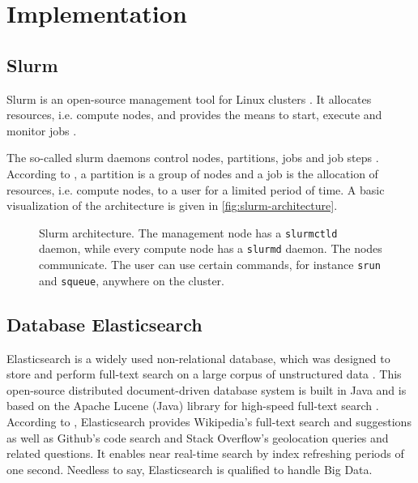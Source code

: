 \newcommand{\databaseName}{Elasticsearch}
\chapter{Implementation}\label{ch:implementation}


\section{Slurm}\label{subsec:slurm}

Slurm is an open-source management tool for Linux clusters \cite{slurm-online}.
It allocates resources, i.e. compute nodes, and provides the means to start, execute and monitor jobs \cite{slurm-online, slurm2003}.

The so-called slurm daemons control nodes, partitions, jobs and job steps \cite{slurm-online}.
According to \citeauthor{slurm-online}, a partition is a group of nodes and a job is the allocation of resources, i.e. compute nodes, to a user for a limited period of time.
A basic visualization of the architecture is given in \autoref{fig:slurm-architecture}.

\begin{figure}[htp] %
    \centering
    
    \caption{Slurm architecture. The management node has a \texttt{slurmctld} daemon, while every compute node has a \texttt{slurmd} daemon.
    The nodes communicate.
    The user can use certain commands, for instance \texttt{srun} and \texttt{squeue}, anywhere on the cluster.
    }
    \label{fig:slurm-architecture}
\end{figure}






\section{Database Elasticsearch}\label{subsec:db}
\databaseName{} is a widely used non-relational database, which was designed to store and perform full-text search on a large corpus of unstructured data \cite{Elasticsearch2017}.
This open-source distributed document-driven database system is built in Java and is based on the Apache Lucene (Java) library for high-speed full-text search \cite{Elasticsearch2017, Elasticsearch2019}.
According to \citeauthor{Elasticsearch2019}, \databaseName{} provides Wikipedia's full-text search and suggestions as well as Github's code search and Stack Overflow's geolocation queries and related questions.
It enables near real-time search by index refreshing periods of one second.
Needless to say, \databaseName{} is qualified to handle Big Data.

